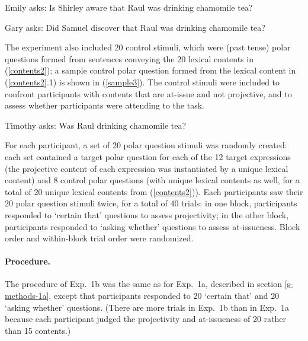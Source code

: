 \documentclass[11pt,fleqn]{article}
\newcommand{\6}{\mbox{$[\hspace*{-.6mm}[$}}
\newcommand{\9}{\mbox{$]\hspace*{-.6mm}]$}}
\begin{document}
\begin{exe}
\ex\label{sample2}
\begin{xlist}
\ex Emily asks: Is Shirley aware that Raul was drinking chamomile tea?

\ex Gary asks: Did Samuel discover that Raul was drinking chamomile tea?
\end{xlist}
\end{exe}

The experiment also included 20 control stimuli, which were (past tense) polar questions formed from sentences conveying the 20 lexical contents in (\ref{contents2}); a sample control polar question formed from the lexical content in (\ref{contents2}.1) is shown in (\ref{sample3}). The control stimuli were included to confront participants with contents that are at-issue and not projective, and to assess whether participants were attending to the task.

\begin{exe}
\ex\label{sample3} Timothy asks: Was Raul drinking chamomile tea?
\end{exe}

For each participant, a set of 20 polar question stimuli was randomly created: each set contained a target polar question for each of the 12 target expressions (the projective content of each expression was instantiated by a unique lexical content) and 8 control polar questions (with unique lexical contents as well, for a total of 20 unique lexical contents from (\ref{contents2})). Each participants saw their 20 polar question stimuli twice, for a total of 40 trials: in one block, participants responded to `certain that' questions to assess projectivity; in the other block, participants responded to `asking whether' questions to assess at-issueness. Block order and within-block trial order were randomized.

\paragraph{Procedure.} The procedure of Exp.~1b was the same as for Exp.~1a, described in section \ref{s-methods-1a}, except that participants responded to 20 `certain that' and 20 `asking whether' questions. (There are more trials in Exp.~1b than in Exp.~1a because each participant judged the projectivity and at-issueness of 20  rather than 15 contents.)
\end{document}
